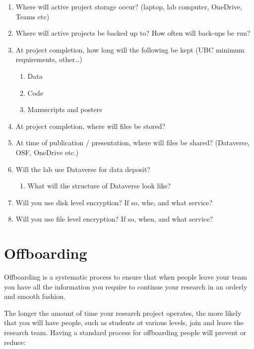 \documentclass[
]{book}
\providecommand{\tightlist}{%
  \setlength{\itemsep}{0pt}\setlength{\parskip}{0pt}}
\begin{document}
\begin{enumerate}
\def\labelenumi{\arabic{enumi}.}
\tightlist
\item
  Where will active project storage occur? (laptop, lab computer, OneDrive, Teams etc)
\item
  Where will active projects be backed up to? How often will back-ups be run?
\item
  At project completion, how long will the following be kept (UBC minimum requirements, other\ldots)

  \begin{enumerate}
  \def\labelenumii{\alph{enumii}.}
  \tightlist
  \item
    Data
  \item
    Code
  \item
    Manuscripts and posters
  \end{enumerate}
\item
  At project completion, where will files be stored?
\item
  At time of publication / presentation, where will files be shared? (Dataverse, OSF, OneDrive etc.)
\item
  Will the lab use Dataverse for data deposit?

  \begin{enumerate}
  \def\labelenumii{\alph{enumii}.}
  \tightlist
  \item
    What will the structure of Dataverse look like?
  \end{enumerate}
\item
  Will you use disk level encryption? If so, whe, and what service?
\item
  Will you use file level encryption? If so, when, and what service?
\end{enumerate}

\hypertarget{offboarding-1}{%
\chapter*{Offboarding}\label{offboarding-1}}

Offboarding is a systematic process to ensure that when people leave your team you have all the information you require to continue your research in an orderly and smooth fashion.

The longer the amount of time your research project operates, the more likely that you will have people, such as students at various levels, join and leave the research team. Having a standard process for offboarding people will prevent or reduce:
\end{document}
